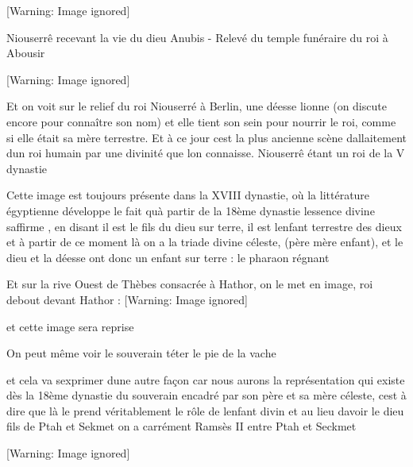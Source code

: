 \documentclass{article}
\begin{document}
  [Warning: Image ignored] %
 

Niouserrê recevant la vie du dieu Anubis - Relevé du temple funéraire du
roi à Abousir

  [Warning: Image ignored] %
 

Et on voit  sur le relief du roi Niouserré à Berlin, une déesse lionne
(on discute encore pour connaître son nom) et elle tient son sein pour
nourrir le roi, comme si elle était sa mère terrestre. Et  à ce jour
c{\textquotesingle}est la plus ancienne scène
d{\textquotesingle}allaitement d{\textquotesingle}un roi humain par une
divinité que l{\textquotesingle}on connaisse. Niouserrê étant un roi de
la V dynastie

Cette image est toujours présente dans la XVIII dynastie, où la
littérature égyptienne développe le fait qu{\textquotesingle}à partir
de la 18ème dynastie l{\textquotesingle}essence divine
s{\textquotesingle}affirme , en disant {\textquotedbl} il est le fils
du dieu sur terre, il est l{\textquotesingle}enfant terrestre des dieux
et  à partir de ce moment là on a la triade divine céleste, (père mère
enfant),  et le dieu et la déesse ont donc un enfant sur terre : le
pharaon régnant

Et sur la rive Ouest de Thèbes consacrée à Hathor,  on le met en image,
roi debout devant Hathor :  [Warning: Image ignored]
 

 et cette image sera reprise

On peut même voir le souverain téter le pie de la vache

et cela va s{\textquotesingle}exprimer d{\textquotesingle}une autre
façon car nous aurons la représentation qui existe dès la 18ème
dynastie du souverain encadré par son père et sa mère céleste,
c{\textquotesingle}est à dire que là le prend véritablement le rôle de
l{\textquotesingle}enfant divin et au lieu d{\textquotesingle}avoir le
dieu fils de Ptah et Sekmet on a carrément Ramsès II entre Ptah et
Seckmet

  [Warning: Image ignored] %
 
\end{document}

